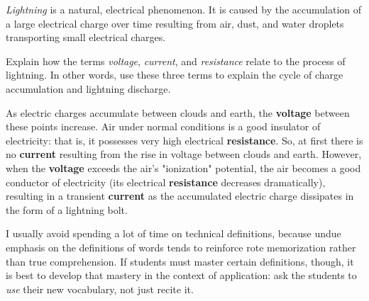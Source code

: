 

{\it Lightning} is a natural, electrical phenomenon.  It is caused by the accumulation of a large electrical charge over time resulting from air, dust, and water droplets transporting small electrical charges.

Explain how the terms {\it voltage}, {\it current}, and {\it resistance} relate to the process of lightning.  In other words, use these three terms to explain the cycle of charge accumulation and lightning discharge.
 






As electric charges accumulate between clouds and earth, the {\bf voltage} between these points increase.  Air under normal conditions is a good insulator of electricity: that is, it possesses very high electrical {\bf resistance}.  So, at first there is no {\bf current} resulting from the rise in voltage between clouds and earth.  However, when the {\bf voltage} exceeds the air's "ionization" potential, the air becomes a good conductor of electricity (its electrical {\bf resistance} decreases dramatically), resulting in a transient {\bf current} as the accumulated electric charge dissipates in the form of a lightning bolt.







I usually avoid spending a lot of time on technical definitions, because undue emphasis on the definitions of words tends to reinforce rote memorization rather than true comprehension.  If students must master certain definitions, though, it is best to develop that mastery in the context of application: ask the students to {\it use} their new vocabulary, not just recite it.




